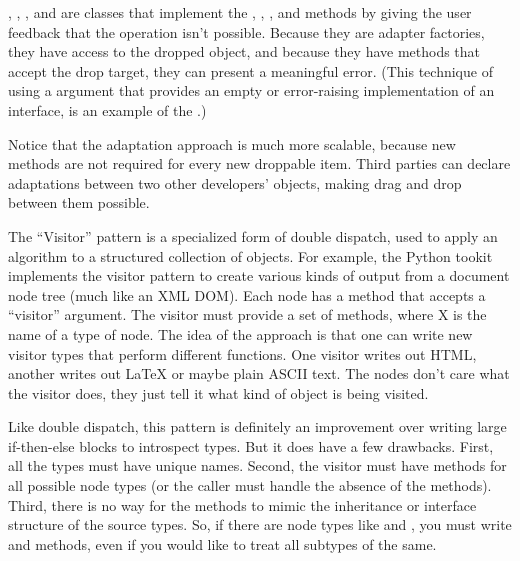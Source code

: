 \begin{verbatim%
}
\begin{verbatim%
}
\begin{verbatim%
}
\begin{verbatim%
}
\begin{verbatim%
}
\begin{verbatim%
}
\begin{verbatim%
}
\begin{verbatim%
}
\begin{verbatim%
}
\begin{verbatim%
}
\begin{verbatim%
}
\begin{verbatim%
}
\begin{verbatim%
}
\begin{verbatim%
}
, , , and
 are classes that implement the ,
, , and  methods by
giving the user feedback that the operation isn't possible.  Because they are
adapter factories, they have access to the dropped object, and because they have
methods that accept the drop target, they can present a meaningful error.  (This
technique of using a  argument that provides an empty or
error-raising implementation of an interface, is an example of the .)

Notice that the adaptation approach is much more scalable, because new methods
are not required for every new droppable item.  Third parties can declare
adaptations between two other developers' objects, making drag and drop between
them possible.



The ``Visitor'' pattern is a specialized form of double dispatch, used to apply
an algorithm to a structured collection of objects.  For example, the Python
 tookit implements the visitor pattern to create various
kinds of output from a document node tree (much like an XML DOM).  Each node has
a  method that accepts a ``visitor'' argument.  The visitor must
provide a set of  methods, where X is the name of a type of node.
The idea of the approach is that one can write new visitor types that perform
different functions.  One visitor writes out HTML, another writes out LaTeX or
maybe plain ASCII text.  The nodes don't care what the visitor does, they just
tell it what kind of object is being visited.

Like double dispatch, this pattern is definitely an improvement over writing
large if-then-else blocks to introspect types.  But it does have a few
drawbacks.  First, all the types must have unique names.  Second, the visitor
must have methods for all possible node types (or the caller must handle the
absence of the methods).  Third, there is no way for the methods to mimic the
inheritance or interface structure of the source types.  So, if there are node
types like  and , you must write 
and  methods, even if you would like to treat all subtypes
of  the same.


\end{verbatim%
}
\end{verbatim%
}
\end{verbatim%
}
\end{verbatim%
}
\end{verbatim%
}
\end{verbatim%
}
\end{verbatim%
}
\end{verbatim%
}
\end{verbatim%
}
\end{verbatim%
}
\end{verbatim%
}
\end{verbatim%
}
\end{verbatim%
}
\end{verbatim%
}
